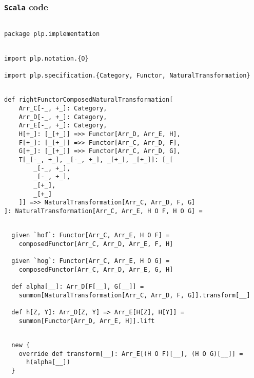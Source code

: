 \documentclass[11pt]{article}
\newcommand{\code}{\subsubsection{{\tt Scala} code}\begingroup\rm \vspace{12pt}}
\def\edefn{\endgroup\par\pagebreak[2]\addvspace{\medskipamount}}
\let\ecode=\edefn
\begin{document}
\code
\begin{mdframed}[backgroundcolor=lightgray!20] 
\begin{lstlisting}

package plp.implementation
\end{lstlisting}
\end{mdframed}
\vspace{6pt}
\begin{mdframed}[backgroundcolor=lightgray!20] 
\begin{lstlisting}

import plp.notation.{O}

import plp.specification.{Category, Functor, NaturalTransformation}
\end{lstlisting}
\end{mdframed}
\vspace{6pt}
\begin{mdframed}[backgroundcolor=lightgray!20] 
\begin{lstlisting}

def rightFunctorComposedNaturalTransformation[
    Arr_C[-_, +_]: Category,
    Arr_D[-_, +_]: Category,
    Arr_E[-_, +_]: Category,
    H[+_]: [_[+_]] =>> Functor[Arr_D, Arr_E, H],
    F[+_]: [_[+_]] =>> Functor[Arr_C, Arr_D, F],
    G[+_]: [_[+_]] =>> Functor[Arr_C, Arr_D, G],
    T[_[-_, +_], _[-_, +_], _[+_], _[+_]]: [_[
        _[-_, +_],
        _[-_, +_],
        _[+_],
        _[+_]
    ]] =>> NaturalTransformation[Arr_C, Arr_D, F, G]
]: NaturalTransformation[Arr_C, Arr_E, H O F, H O G] =
\end{lstlisting}
\end{mdframed}
\vspace{6pt}
\begin{mdframed}[backgroundcolor=lightgray!20] 
\begin{lstlisting}

  given `hof`: Functor[Arr_C, Arr_E, H O F] =
    composedFunctor[Arr_C, Arr_D, Arr_E, F, H]

  given `hog`: Functor[Arr_C, Arr_E, H O G] =
    composedFunctor[Arr_C, Arr_D, Arr_E, G, H]

  def alpha[__]: Arr_D[F[__], G[__]] =
    summon[NaturalTransformation[Arr_C, Arr_D, F, G]].transform[__]

  def h[Z, Y]: Arr_D[Z, Y] => Arr_E[H[Z], H[Y]] =
    summon[Functor[Arr_D, Arr_E, H]].lift
\end{lstlisting}
\end{mdframed}
\vspace{6pt}
\begin{mdframed}[backgroundcolor=lightgray!20] 
\begin{lstlisting}

  new {
    override def transform[__]: Arr_E[(H O F)[__], (H O G)[__]] =
      h(alpha[__])
  }
\end{lstlisting}
\end{mdframed}
\ecode
\end{document}
